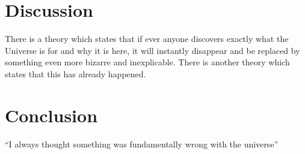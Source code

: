 \documentclass{article}
\begin{document}
\section{Discussion}
There is a theory which states that if ever anyone discovers exactly what the Universe is for and why it is here, it will instantly disappear and be replaced by something even more bizarre and inexplicable.
There is another theory which states that this has already happened.


\section{Conclusion}
``I always thought something was fundamentally wrong with the universe'' \citep{adams1995hitchhiker}



\end{document}
